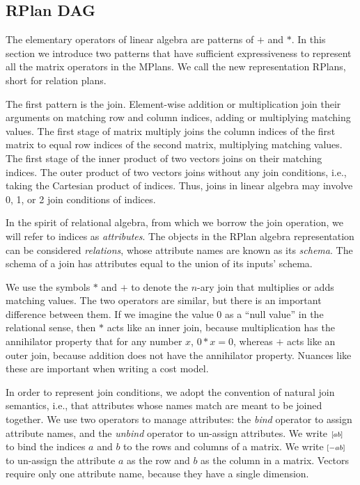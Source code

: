 \subsection{RPlan DAG}
The elementary operators of linear algebra are patterns of $+$ and $*$.
In this section we introduce two patterns that have sufficient expressiveness to represent all the matrix operators in the MPlans.  We call the new representation RPlans, short for relation plans.

The first pattern is the join.  
Element-wise addition or multiplication join their arguments on matching row and column indices, adding or multiplying matching values.
The first stage of matrix multiply joins the column indices of the first matrix to equal row indices of the second matrix, multiplying matching values.
The first stage of the inner product of two vectors joins on their matching indices.
The outer product of two vectors joins without any join conditions, i.e., taking the Cartesian product of indices.
Thus, joins in linear algebra may involve 0, 1, or 2 join conditions of indices.

In the spirit of relational algebra, from which we borrow the join operation, we will refer to indices as \textit{attributes}.
The objects in the RPlan algebra representation can be considered \textit{relations},
whose attribute names are known as its \textit{schema}.
The schema of a join has attributes equal to the union of its inputs' schema.

We use the symbols $*$ and $+$ to denote the $n$-ary join that multiplies or adds matching values.
The two operators are similar, but there is an important difference between them.  
If we imagine the value 0 as a ``null value'' in the relational sense,
then $*$ acts like an inner join, because multiplication has the annihilator property that for any number $x$, $0 * x = 0$,
whereas $+$ acts like an outer join, because addition does not have the annihilator property.
Nuances like these are important when writing a cost model.

In order to represent join conditions, we adopt the convention of natural join semantics, i.e., that attributes whose names match are meant to be joined together.
We use two operators to manage attributes:
the \textit{bind} operator to assign attribute names, and the \textit{unbind} operator to un-assign attributes.
We write ${\scriptstyle\left[ab\right]\,}$ to bind the indices $a$ and $b$ to the rows and columns of a matrix.
We write ${\scriptstyle\left[-ab\right]\,}$ to un-assign the attribute $a$ as the row and $b$ as the column in a matrix.
Vectors require only one attribute name, because they have a single dimension.

